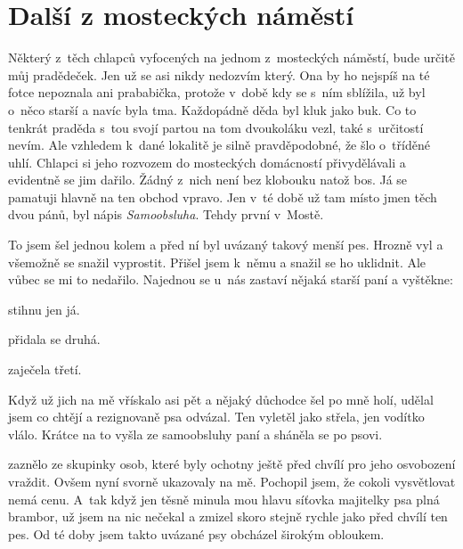 
\chapter{Další z mosteckých náměstí}

Některý z~těch chlapců vyfocených na jednom z~mosteckých náměstí, bude určitě
můj pradědeček. Jen už se asi nikdy nedozvím který. Ona by ho nejspíš na té
fotce nepoznala ani prababička, protože v~době kdy se s~ním sblížila, už byl
o~něco starší a navíc byla tma. Každopádně děda byl kluk jako buk. Co to
tenkrát praděda s~tou svojí partou na tom dvoukoláku vezl, také s~určitostí
nevím. Ale vzhledem k~dané lokalitě je silně pravděpodobné, že šlo o~tříděné
uhlí. Chlapci si jeho rozvozem do mosteckých domácností přivydělávali a
evidentně se jim dařilo. Žádný z~nich není bez klobouku natož bos. Já se
pamatuji hlavně na ten obchod vpravo. Jen v~té době už tam místo jmen těch dvou
pánů, byl nápis {\em Samoobsluha}. Tehdy první v~Mostě.

To jsem šel jednou kolem a před ní byl uvázaný takový menší pes. Hrozně vyl a
všemožně se snažil vyprostit. Přišel jsem k~němu a snažil se ho uklidnit. Ale
vůbec se mi to nedařilo. Najednou se u~nás zastaví nějaká starší paní a
vyštěkne: 

 stihnu jen já.

 přidala se
druhá.

 zaječela
třetí.

Když už jich na mě vřískalo asi pět a nějaký důchodce šel po mně holí, udělal
jsem co chtějí a rezignovaně psa odvázal. Ten vyletěl jako střela, jen vodítko
vlálo. Krátce na to vyšla ze samoobsluhy paní a sháněla se po psovi.

 zaznělo ze
skupinky osob, které byly ochotny ještě před chvílí pro jeho osvobození
vraždit. Ovšem nyní svorně ukazovaly na mě. Pochopil jsem, že cokoli
vysvětlovat nemá cenu. A~tak když jen těsně minula mou hlavu síťovka majitelky
psa plná brambor, už jsem na nic nečekal a zmizel skoro stejně rychle jako před
chvílí ten pes. Od té doby jsem takto uvázané psy obcházel širokým obloukem.

